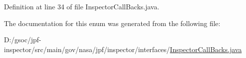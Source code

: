 Definition at line 34 of file Inspector\+Call\+Backs.\+java.



The documentation for this enum was generated from the following file\+:\begin{DoxyCompactItemize}
\item 
D\+:/gsoc/jpf-\/inspector/src/main/gov/nasa/jpf/inspector/interfaces/\hyperlink{_inspector_call_backs_8java}{Inspector\+Call\+Backs.\+java}\end{DoxyCompactItemize}
